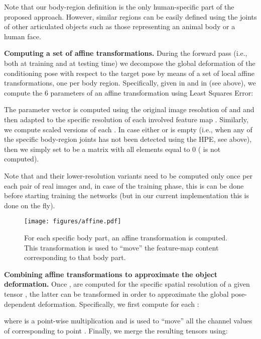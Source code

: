 \documentclass[10pt,twocolumn,letterpaper]{article}
\begin{document}
Note  that our body-region definition  is the only human-specific part of the proposed approach. However, similar regions can be easily defined using the joints of other articulated objects such as those representing an animal body  or a human face.




{\bf Computing a set of affine transformations.} 
During the forward pass (i.e., both at training and at testing time) we decompose the global deformation of the conditioning pose with respect to the target pose by means of a set of local affine transformations, one per body region. Specifically, given  in  and  in  (see above), we compute the 6  parameters  of an affine transformation 
using Least Squares Error:



The parameter vector 
 is computed using the original image resolution of  and  and then adapted to the specific resolution of each involved  feature map .
Similarly, we compute scaled versions of each .
In case either  or  is empty (i.e., when any of the specific body-region joints has not been detected using the HPE, see above), then we simply set    to be a matrix with all elements equal to 0 ( is not computed).

 Note that   and their lower-resolution variants need to be computed 
only once  per each pair of real images  and, in case of the training phase, this is can be done before starting training the networks (but in our current implementation this is done on the fly).

\begin{figure}[t!]\centering
\texttt{[image: figures/affine.pdf]}
\caption{For each specific body part, an  affine transformation   is computed. This transformation is  used to ``move'' the feature-map content corresponding to that body part.}
\label{fig:affinepipeline}
\end{figure}

{\bf Combining affine transformations to approximate the  object deformation.} 
Once ,  are computed for the specific spatial resolution of a given tensor , the latter can be transformed in order to approximate the global pose-dependent deformation.
Specifically, we first compute for each :




\noindent
where  is a point-wise multiplication
and  is used to ``move'' all the channel values of  corresponding to point 
.
Finally, we merge the resulting  tensors using:
\end{document}
